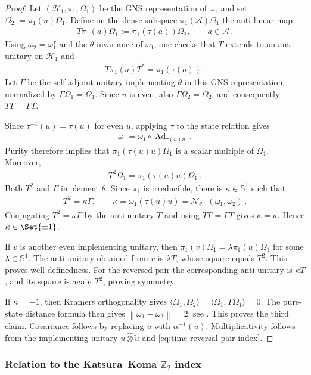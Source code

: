 \documentclass[a4paper,10pt]{article}
\numberwithin{equation}{section}
\theoremstyle{plain}
\theoremstyle{plain}
\theoremstyle{plain}
\theoremstyle{plain}
\theoremstyle{plain}
\theoremstyle{remark}
\theoremstyle{definition}
\newcommand{\ZZ}{\mathbb{Z}}
\newcommand{\calA}{\mathcal{A}}
\newcommand{\calN}{\mathcal{N}}
\newcommand{\calH}{\mathcal{H}}
\newcommand\norm[1]{\left\lVert#1\right\rVert}
\newcommand{\ip}[2]{\langle #1, #2 \rangle}
\newcommand{\Ad}[1]{\operatorname{Ad}_{#1}}
\newcommand{\eq}[1]{\begin{align*}#1\end{align*}}
\newcommand{\eql}[1]{\begin{align}#1\end{align}}
\newcommand{\br}[1]{\left(#1\right)}
\begin{document}
\begin{proof}
Let $(\calH_1,\pi_1,\Omega_1)$ be the GNS representation of
$\omega_1$ and set $\Omega_2:=\pi_1(u)\Omega_1$. Define on the dense
subspace $\pi_1(\calA)\Omega_1$ the anti-linear map
\eql{
    T\pi_1(a)\Omega_1
    :=
    \pi_1(\tau(a))\Omega_2,
    \qquad a\in\calA
    \label{eq:GNS time reversal operator}\,.
}
Using $\omega_2=\omega_1^\tau$ and the $\theta$-invariance of
$\omega_1$, one checks that $T$ extends to an anti-unitary on
$\calH_1$ and
\eq{
    T\pi_1(a)T^*=\pi_1(\tau(a))\,.
}
Let $\Gamma$ be the self-adjoint unitary implementing $\theta$ in this
GNS representation, normalized by $\Gamma\Omega_1=\Omega_1$. Since
$u$ is even, also $\Gamma\Omega_2=\Omega_2$, and consequently
$T\Gamma=\Gamma T$.

Since $\tau^{-1}(u)=\tau(u)$ for even $u$, applying $\tau$ to the
state relation gives
\eq{
    \omega_1
    =
    \omega_1\circ\Ad{\tau(u)u}\,.
}
Purity therefore implies that $\pi_1(\tau(u)u)\Omega_1$ is a scalar
multiple of $\Omega_1$. Moreover,
\eq{
    T^2\Omega_1
    =
    \pi_1(\tau(u)u)\Omega_1\,.
}
Both $T^2$ and $\Gamma$ implement $\theta$. Since $\pi_1$ is
irreducible, there is $\kappa\in\mathbb{S}^1$ such that
\eql{
    T^2=\kappa\Gamma,
    \qquad
    \kappa
    =
    \omega_1\br{\tau(u)u}
    =
    \calN_{\theta,\tau}(\omega_1,\omega_2)
    \label{eq:time reversal square and pair index}\,.
}
Conjugating $T^2=\kappa\Gamma$ by the anti-unitary $T$ and using
$T\Gamma=\Gamma T$ gives $\kappa=\overline{\kappa}$. Hence
$\kappa\in\Set{\pm1}$.

If $v$ is another even implementing unitary, then
$\pi_1(v)\Omega_1=\lambda\pi_1(u)\Omega_1$ for some
$\lambda\in\mathbb{S}^1$. The anti-unitary obtained from $v$ is
$\lambda T$, whose square equals $T^2$. This proves well-definedness.
For the reversed pair the corresponding anti-unitary is $\kappa T$,
and its square is again $T^2$, proving symmetry.

If $\kappa=-1$, then Kramers orthogonality gives
$\ip{\Omega_1}{\Omega_2}=\ip{\Omega_1}{T\Omega_1}=0$. The pure-state
distance formula then gives $\norm{\omega_1-\omega_2}=2$; see
\cite[Lemma~2.4]{PowersStormer1970FreeStates}. This proves the third
claim. Covariance follows by replacing $u$ with $\alpha^{-1}(u)$.
Multiplicativity follows from the implementing unitary
$u\hat\otimes\widetilde{u}$ and
\cref{eq:time reversal pair index}.
\end{proof}

\subsubsection{Relation to the Katsura--Koma $\ZZ_2$ index}
\label{sec:time reversal pair projection correspondence}
\end{document}
